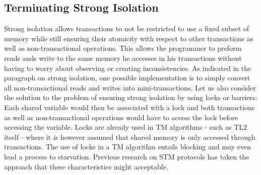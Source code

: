 




\subsection{Terminating Strong  Isolation}
\label{sec:protocol}


Strong isolation allows transactions to not be restricted to use a fixed
subset of memory while still ensuring their atomicity with respect to
other transactions as well as non-transactional operations.
This allows the programmer to preform reads ands write to the same memory he accesses
in his transactions without having to worry about observing or creating inconsistencies.
As indicated in the paragraph on strong isolation, one possible implementation
is to simply convert all non-transactional reads and writes into mini-transactions.
Let us also consider the solution to  the problem of  ensuring strong isolation 
by using  locks or barriers: Each shared
variable would then  
be associated with a lock and both transactions as well as non-transactional 
operations would have to access the lock before accessing the variable.
Locks are already used  in TM algorithms - such as TL2  itself - where it is
however     assumed   that  shared   memory   is   only  accessed   through
transactions. The use  of locks  in a TM algorithm  entails blocking and may
even lead a process to starvation.
Previous research on STM protocols has taken the approach that
these characteristics might acceptable.

